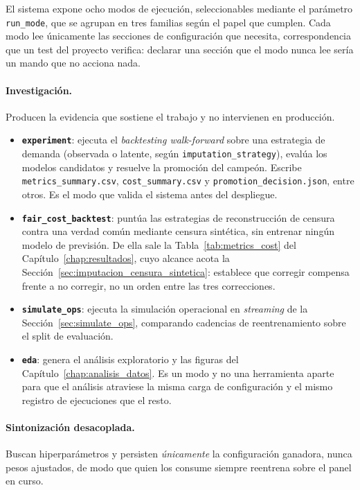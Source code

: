 El sistema expone ocho modos de ejecución, seleccionables mediante el parámetro \texttt{run\_mode}, que se agrupan en tres familias según el papel que cumplen. Cada modo lee únicamente las secciones de configuración que necesita, correspondencia que un test del proyecto verifica: declarar una sección que el modo nunca lee sería un mando que no acciona nada.

\paragraph{Investigación.} Producen la evidencia que sostiene el trabajo y no intervienen en producción.

\begin{itemize}
    \item \textbf{\texttt{experiment}}: ejecuta el \textit{backtesting walk-forward} sobre una estrategia de demanda (observada o latente, según \texttt{imputation\_strategy}), evalúa los modelos candidatos y resuelve la promoción del campeón. Escribe \texttt{metrics\_}\allowbreak\texttt{summary.csv}, \texttt{cost\_}\allowbreak\texttt{summary.csv} y \texttt{promotion\_}\allowbreak\texttt{decision.json}, entre otros. Es el modo que valida el sistema antes del despliegue.
    \item \textbf{\texttt{fair\_cost\_backtest}}: puntúa las estrategias de reconstrucción de censura contra una verdad común mediante censura sintética, sin entrenar ningún modelo de previsión. De ella sale la Tabla~\ref{tab:metrics_cost} del Capítulo~\ref{chap:resultados}, cuyo alcance acota la Sección~\ref{sec:imputacion_censura_sintetica}: establece que corregir compensa frente a no corregir, no un orden entre las tres correcciones.
    \item \textbf{\texttt{simulate\_ops}}: ejecuta la simulación operacional en \textit{streaming} de la Sección~\ref{sec:simulate_ops}, comparando cadencias de reentrenamiento sobre el split de evaluación.
    \item \textbf{\texttt{eda}}: genera el análisis exploratorio y las figuras del Capítulo~\ref{chap:analisis_datos}. Es un modo y no una herramienta aparte para que el análisis atraviese la misma carga de configuración y el mismo registro de ejecuciones que el resto.
\end{itemize}

\paragraph{Sintonización desacoplada.} Buscan hiperparámetros y persisten \emph{únicamente} la configuración ganadora, nunca pesos ajustados, de modo que quien los consume siempre reentrena sobre el panel en curso.

